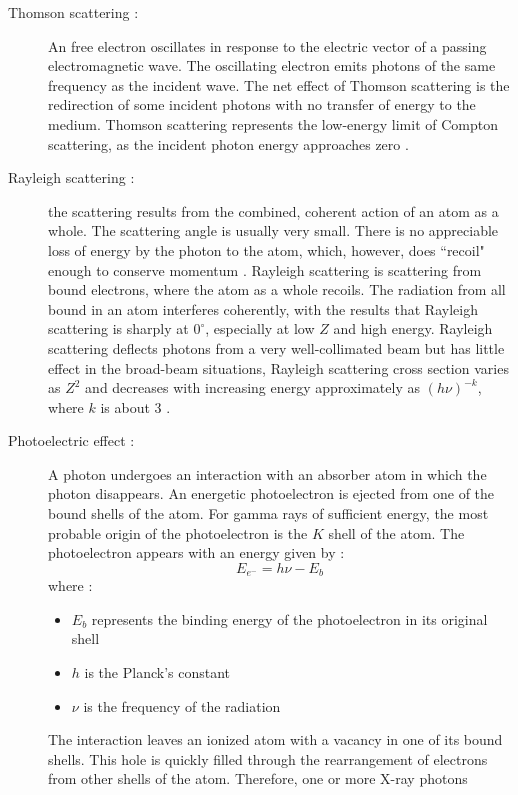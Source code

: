 \begin{description}
\item [Thomson scattering :] An free electron oscillates in response to the 
electric vector of a passing electromagnetic wave. The oscillating electron 
emits photons of the same frequency as the incident wave. The net effect of 
Thomson scattering is the redirection of
some incident photons with no transfer of energy to the medium. Thomson
scattering represents the low-energy limit of Compton scattering, as the
incident photon energy approaches zero \cite{radiation}.
\item [Rayleigh scattering :] the scattering results from the combined,
coherent action of an atom as a whole. The scattering angle is usually very
small. There is no appreciable loss of energy by the photon to the atom,
which, however, does ``recoil" enough to conserve momentum \cite{radiation}.
Rayleigh scattering is scattering from bound electrons, where the atom as a
whole recoils. The radiation from all bound in an atom interferes coherently,
with the results that Rayleigh scattering is sharply at $0^{\circ}$,
especially at low $Z$ and high energy. Rayleigh scattering deflects photons from
a very well-collimated beam but has little effect in the broad-beam
situations, Rayleigh scattering cross section varies as $Z^2$ and decreases
with increasing energy approximately as $(h \nu)^{-k}$, where $k$ is about 3
\cite{shielding}.
\item [Photoelectric effect :] A photon undergoes an interaction with an
absorber atom in which the photon disappears. An energetic photoelectron is
ejected from one of the bound shells of the atom. For gamma rays of
sufficient energy, the most probable origin of the photoelectron is the $K$
shell of the atom. The photoelectron appears with an energy given by :
\begin{equation}
E_{e^-} = h\nu -E_b
\end{equation}
where :
\begin{itemize}
\item $E_b$ represents the binding energy of the photoelectron in its original
shell
\item $h$ is the Planck's constant
\item $\nu$ is the frequency of the radiation 
\end{itemize}
The interaction leaves an ionized atom with a vacancy in one
of its bound shells. This hole is quickly filled through the rearrangement of
electrons from other shells of the atom. Therefore, one or more X-ray photons

\end{description}
